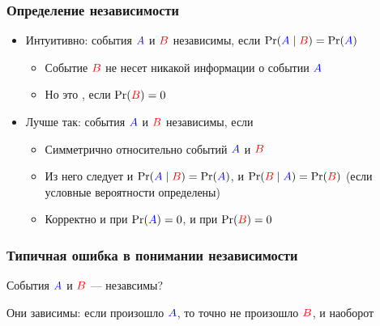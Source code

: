 \documentclass[hyperref=unicode,graphics=pdflatex,13pt,xcolor={usenames,dvipsnames}]{beamer}
\newcommand\hl[1]{{\color{blue}{#1}}}
\newcommand\red[1]{{\color{red}{#1}}}
\newcommand\pitem{\pause\item}
\begin{document}
\begin{frame}
  \frametitle{Определение независимости}
  \begin{itemize}
    \item Интуитивно: события $\hl{A}$ и $\red{B}$ независимы, если
    $\Pr(\hl{A} \mid \red{B}) = \Pr(\hl{A})$
    \begin{itemize}
      \item Событие $\red{B}$ не несет никакой информации о событии $\hl{A}$
      \pitem Но это \red{не работает}, если $\Pr(\red{B}) = 0$
    \end{itemize}
    \pitem Лучше так: события $\hl{A}$ и $\red{B}$ независимы, если
    \begin{center}
    \end{center}
    \begin{itemize}
      \item Симметрично относительно событий $\hl{A}$ и $\red{B}$
      \item Из него следует и $\Pr(\hl{A} \mid \red{B}) = \Pr(\hl{A})$, и $\Pr(\red{B} \mid \hl{A}) = \Pr(\red{B})$ (если условные вероятности определены)
      \item Корректно и при $\Pr(\hl{A}) = 0$, и при $\Pr(\red{B}) = 0$
    \end{itemize}
  \end{itemize}
\end{frame}

\begin{frame}
  \frametitle{Типичная ошибка в понимании независимости}

  \begin{center}

    События $\hl{A}$ и $\red{B}$ --- незавсимы?
  \end{center}
  \pause Они \hl{максимально} зависимы: если произошло $\hl{A}$, то точно не произошло $\red{B}$, и наоборот

\end{frame}
\end{document}
